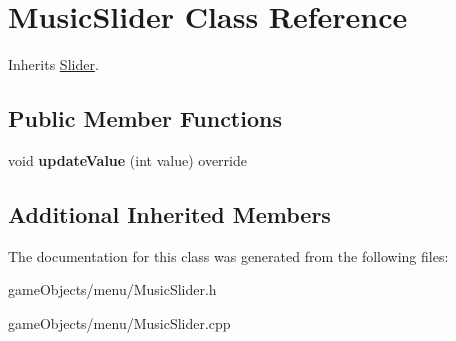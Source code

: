 \hypertarget{class_music_slider}{\section{Music\+Slider Class Reference}
\label{class_music_slider}
}


Inherits \hyperlink{class_slider}{Slider}.

\subsection*{Public Member Functions}
\begin{DoxyCompactItemize}
\item 
\hypertarget{class_music_slider_ab4f10b03814686c9f57c9e63b516791c}{void {\bfseries update\+Value} (int value) override}\label{class_music_slider_ab4f10b03814686c9f57c9e63b516791c}

\end{DoxyCompactItemize}
\subsection*{Additional Inherited Members}


The documentation for this class was generated from the following files\+:\begin{DoxyCompactItemize}
\item 
game\+Objects/menu/Music\+Slider.\+h\item 
game\+Objects/menu/Music\+Slider.\+cpp\end{DoxyCompactItemize}
